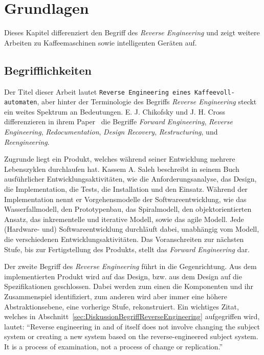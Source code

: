 \chapter{Grundlagen}\label{ch:Grundlagen}
Dieses Kapitel differenziert den Begriff des \textit{Reverse Engineering} und zeigt weitere Arbeiten zu Kaffeemaschinen sowie intelligenten Geräten auf.

\section{Begrifflichkeiten}\label{sec:Begrifflichkeiten}
Der Titel dieser Arbeit lautet \texttt{Reverse Engineering eines Kaffeevoll-\\automaten}, aber hinter der Terminologie des Begriffs \textit{Reverse Engineering} steckt ein weites Spektrum an Bedeutungen.
E. J. Chikofsky und J. H. Cross differenzieren in ihrem Paper~\cite{43044} die Begriffe \textit{Forward Engineering}, \textit{Reverse Engineering}, \textit{Redocumentation}, \textit{Design Recovery}, \textit{Restructuring}, und \textit{Reengineering}.

Zugrunde liegt ein Produkt, welches während seiner Entwicklung mehrere Lebenszyklen durchlaufen hat.
Kassem A. Saleh beschreibt in seinem Buch~\cite{Solr-599853700} ausführlicher Entwicklungsaktivitäten, wie die Anforderungsanalyse, das Design, die Implementation, die Tests, die Installation und den Einsatz.
Während der Implementation nennt er Vorgehensmodelle der Softwareentwicklung, wie das Wasserfallmodell, den Prototypenbau, das Spiralmodell, den objektorientierten Ansatz, das inkrementelle und iterative Modell, sowie das agile Modell.
Jede (Hardware- und) Softwareentwicklung durchläuft dabei, unabhängig vom Modell, die verschiedenen Entwicklungsaktivitäten.
Das Voranschreiten zur nächsten Stufe, bis zur Fertigstellung des Produkts, stellt das \textit{Forward Engineering} dar.

Der zweite Begriff des \textit{Reverse Engineering} führt in die Gegenrichtung.
Aus dem implementierten Produkt wird auf das Design, bzw. aus dem Design auf die Spezifikationen geschlossen.
Dabei werden zum einen die Komponenten und ihr Zusammenspiel identifiziert, zum anderen wird aber immer eine höhere Abstraktionsebene, eine vorherige Stufe, rekonstruiert.
Ein wichtiges Zitat, welches in Abschnitt~\ref{sec:DiskussionBegriffReverseEngineering}  aufgegriffen wird, lautet: "`Reverse engineering in and of itself does not involve changing the subject system or creating a new system based on the reverse-engineered subject system.
It is a process of examination, not a process of change or replication."'\cite{43044}


